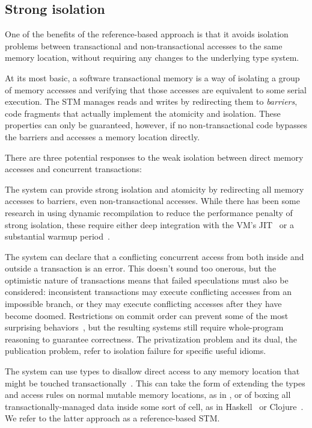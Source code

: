 \subsection{Strong isolation}

One of the benefits of the reference-based approach is that it avoids
isolation problems between transactional and non-transactional accesses to
the same memory location, without requiring any changes to the underlying
type system.

At its most basic, a software transactional memory is a way of isolating
a group of memory accesses and verifying that those accesses are
equivalent to some serial execution.  The STM manages reads and writes
by redirecting them to \textit{barriers}, code fragments that actually
implement the atomicity and isolation.  These properties can only be
guaranteed, however, if no non-transactional code bypasses the barriers
and accesses a memory location directly.

There are three potential responses to the weak isolation between direct memory
accesses and concurrent transactions:
\begin{packed_itemize}

\item The system can provide strong isolation and atomicity by redirecting
all memory accesses to barriers, even non-transactional accesses.
While there has been some research in using dynamic recompilation
to reduce the performance penalty of strong isolation, these require
either deep integration with the VM's JIT~\cite{schneider08dynamic}
or a substantial warmup period~\cite{bronson09dbo}.

\item The system can declare that a conflicting concurrent access
from both inside and outside a transaction is an error.  This doesn't
sound too onerous, but the optimistic nature of transactions means that
failed speculations must also be considered: inconsistent transactions
may execute conflicting accesses from an impossible branch, or they
may execute conflicting accesses after they have become doomed.
Restrictions on commit order can prevent some of the most surprising
behaviors~\cite{sgla08}, but the resulting systems still require
whole-program reasoning to guarantee correctness.  The privatization
problem and its dual, the publication problem, refer to isolation failure
for specific useful idioms.

\item The system can use types to disallow direct access to any memory
location that might be touched transactionally~\cite{moore08semantics}.
This can take the form of extending the types and access rules on
normal mutable memory locations, as in , or
of boxing all transactionally-managed data inside some sort of cell,
as in Haskell~\cite{harris05composable} or Clojure~\cite{?}.  We refer to the latter
approach as a reference-based STM.

\end{packed_itemize}

